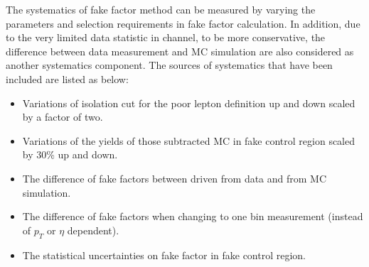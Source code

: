 The systematics of fake factor method can be measured by varying the parameters and selection requirements in fake factor calculation.
In addition, due to the very limited data statistic in \llll channel, to be more conservative, 
the difference between data measurement and MC simulation are also considered as another systematics component.
The sources of systematics that have been included are listed as below:
\begin{itemize}
	\item Variations of isolation cut for the poor lepton definition up and down scaled by a factor of two.
	\item Variations of the yields of those subtracted MC in fake control region scaled by 30\% up and down.
	\item The difference of fake factors between driven from data and from MC simulation.
	\item The difference of fake factors when changing to one bin measurement (instead of $p_{T}$ or $\eta$ dependent).
	\item The statistical uncertainties on fake factor in fake control region.
\end{itemize}


